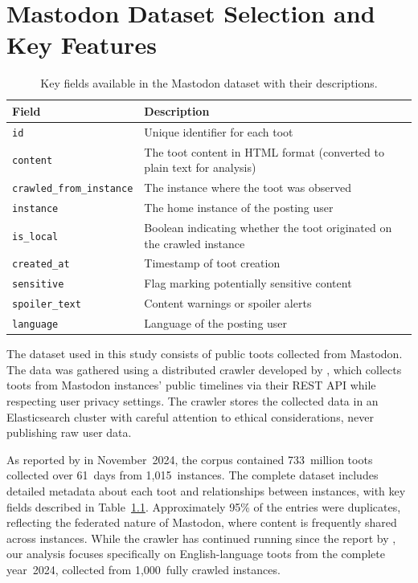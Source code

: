 \chapter{Mastodon Dataset Selection and Key Features} \label{dataset-description}

\begin{table}[tb]
    \centering\small
    \renewcommand{\arraystretch}{1.3}
    \begin{tabularx}{\textwidth}{lX}
        \toprule
        \textbf{Field} & \textbf{Description} \\
        \midrule
        \texttt{id} & Unique identifier for each toot \\
        \texttt{content} & The toot content in HTML format (converted to plain text for analysis) \\
        \texttt{crawled\_from\_instance} & The instance where the toot was observed \\
        \texttt{instance} & The home instance of the posting user \\
        \texttt{is\_local} & Boolean indicating whether the toot originated on the crawled instance \\
        \texttt{created\_at} & Timestamp of toot creation \\
        \texttt{sensitive} & Flag marking potentially sensitive content \\
        \texttt{spoiler\_text} & Content warnings or spoiler alerts \\
        \texttt{language} & Language of the posting user \\
        \bottomrule
    \end{tabularx}
    \caption{Key fields available in the Mastodon dataset with their descriptions.}
    \label{dataset-fields}
\end{table}

The dataset used in this study consists of public toots collected from Mastodon. The data was gathered using a distributed crawler developed by \citet{wiegmann:2024}, which collects toots from Mastodon instances' public timelines via their REST API while respecting user privacy settings. The crawler stores the collected data in an Elasticsearch cluster with careful attention to ethical considerations, never publishing raw user data.

As reported by \citet{wiegmann:2024} in November~2024, the corpus contained 733~million toots collected over 61~days from 1,015~instances. The complete dataset includes detailed metadata about each toot and relationships between instances, with key fields described in Table~\ref{dataset-fields}. Approximately 95\% of the entries were duplicates, reflecting the federated nature of Mastodon, where content is frequently shared across instances. While the crawler has continued running since the report by \citet{wiegmann:2024}, our analysis focuses specifically on English-language toots from the complete year~2024, collected from 1,000~fully crawled instances.


